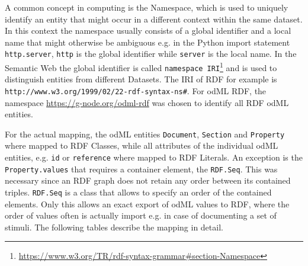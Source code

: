 \documentclass{article}
\begin{document}
A common concept in computing is the Namespace, which is used to uniquely identify an entity that might occur in a different context within the same dataset. In this context the namespace usually consists of a global identifier and a local name that might otherwise be ambiguous e.g. in the Python import statement \texttt{http.server}, \texttt{http} is the global identifier while \texttt{server} is the local name.
In the Semantic Web the global identifier is called \texttt{namespace IRI}\footnote{\url{https://www.w3.org/TR/rdf-syntax-grammar#section-Namespace}} and is used to distinguish entities from different Datasets. The IRI of RDF for example is \texttt{http://www.w3.org/1999/02/22-rdf-syntax-ns#}.
For odML RDF, the namespace \url{https://g-node.org/odml-rdf} was chosen to identify all RDF odML entities.

For the actual mapping, the odML entities \texttt{Document}, \texttt{Section} and \texttt{Property} where mapped to RDF Classes, while all attributes of the individual odML entities, e.g. \texttt{id} or \texttt{reference} where mapped to RDF Literals. An exception is the \texttt{Property.values} that requires a container element, the \texttt{RDF.Seq}. This was necessary since an RDF graph does not retain any order between its contained triples. \texttt{RDF.Seq} is a class that allows to specify an order of the contained elements. Only this allows an exact export of odML values to RDF, where the order of values often is actually import e.g. in case of documenting a set of stimuli. The following tables describe the mapping in detail.
\end{document}
